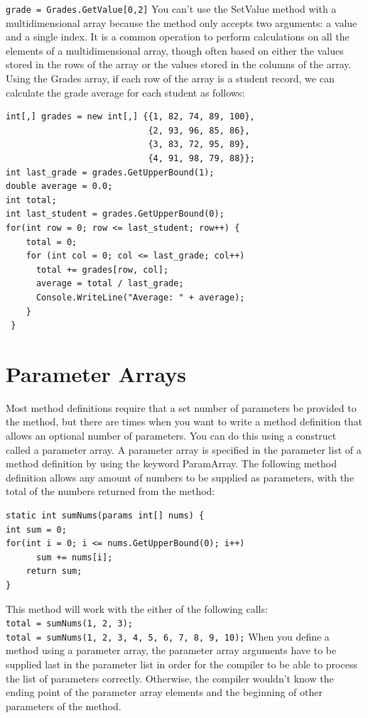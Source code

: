 \documentclass[12pt,a4paper,final,twoside,titlepage]{book}
\begin{document}
\texttt{grade = Grades.GetValue[0,2]}
You can’t use the SetValue method with a multidimensional array because the method only accepts two arguments: a value and a single index.
It is a common operation to perform calculations on all the elements of a multidimensional array, though often based on either the values stored in the rows of the array or the values stored in the columns of the array. Using the Grades array, if each row of the array is a student record, we can calculate the grade average for each student as follows:
\begin{lstlisting}
int[,] grades = new int[,] {{1, 82, 74, 89, 100}, 
							{2, 93, 96, 85, 86}, 
							{3, 83, 72, 95, 89},
							{4, 91, 98, 79, 88}}; 
int last_grade = grades.GetUpperBound(1);
double average = 0.0;
int total;
int last_student = grades.GetUpperBound(0); 
for(int row = 0; row <= last_student; row++) {
    total = 0;
    for (int col = 0; col <= last_grade; col++)
      total += grades[row, col];
      average = total / last_grade;
      Console.WriteLine("Average: " + average);
	}
 }
\end{lstlisting}

\section{Parameter Arrays}
Most method definitions require that a set number of parameters be provided to the method, but there are times when you want to write a method definition that allows an optional number of parameters. You can do this using a construct called a parameter array. A parameter array is specified in the parameter list of a method definition by using the keyword ParamArray. The following method definition allows any amount of numbers to be supplied as parameters, with the total of the numbers returned from the method:
\begin{lstlisting}
static int sumNums(params int[] nums) {
int sum = 0;
for(int i = 0; i <= nums.GetUpperBound(0); i++)
      sum += nums[i];
    return sum;
}
\end{lstlisting}
This method will work with the either of the following calls:\\
\texttt{total = sumNums(1, 2, 3); \\total = sumNums(1, 2, 3, 4, 5, 6, 7, 8, 9, 10);}
When you define a method using a parameter array, the parameter array arguments have to be supplied last in the parameter list in order for the compiler to be able to process the list of parameters correctly. Otherwise, the compiler wouldn’t know the ending point of the parameter array elements and the beginning of other parameters of the method.
\end{document}
